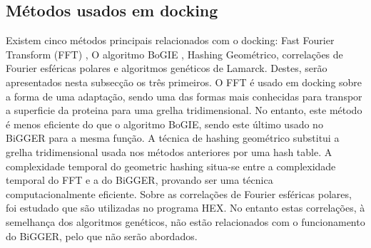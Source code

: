 \subsection{Métodos usados em docking}
Existem cinco métodos principais relacionados com o docking: Fast Fourier Transform (FFT) \cite{katchalski1992}, O algoritmo BoGIE \cite{biggerPaper}, Hashing Geométrico\cite{geometry}, correlações de Fourier esféricas polares\cite{ritchiew} e algoritmos genéticos de Lamarck. Destes, serão apresentados nesta subsecção os três primeiros. O FFT é usado em docking sobre a forma de uma adaptação, sendo uma das formas mais conhecidas para transpor a superficie da proteina para uma grelha tridimensional. No entanto, este método é menos eficiente do que o algoritmo BoGIE, sendo este último usado no BiGGER para a mesma função. A técnica de hashing geométrico substitui a grelha tridimensional usada nos métodos anteriores por uma hash table. A complexidade temporal do geometric hashing situa-se entre a complexidade temporal do FFT e a do BiGGER, provando ser uma técnica computacionalmente eficiente. Sobre as correlações de Fourier esféricas polares, foi estudado que são utilizadas no programa HEX\cite{ritchiew}. No entanto estas correlações, à semelhança dos algoritmos genéticos, não estão relacionados com o funcionamento do BiGGER, pelo que não serão abordados.
